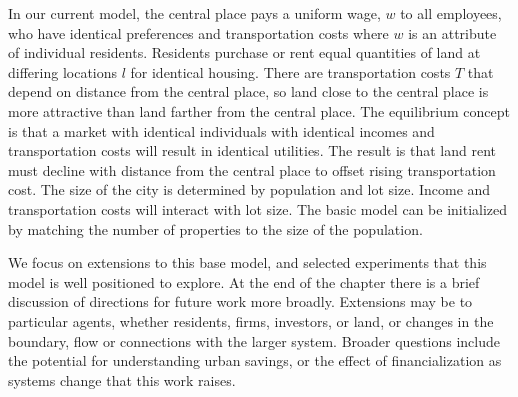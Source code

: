 

In our current model, the central place pays a uniform wage, $w$ to all employees, who have identical preferences and transportation costs where $w$ is an attribute of individual residents. Residents purchase or rent equal quantities of land at differing locations $l$ for identical housing.  There are transportation costs $T$ that depend on distance from the central place, so land close to the central place is more attractive than land farther from the central place.  The equilibrium concept is that a market with identical individuals with identical incomes and transportation costs will result in identical utilities. The result is that land rent must decline with distance from the central place to offset rising transportation cost. The size of the city is determined by population and lot size. Income and transportation costs will interact with lot size. The basic model can be initialized by matching the number of properties to the size of the population. %

We focus on extensions to this base model, and selected experiments that this model is well positioned to explore.  At the end of the chapter there is a brief discussion of directions for future work more broadly. Extensions may be to particular agents, whether residents, firms, investors, or land, or changes in the boundary, flow or connections with the larger system. Broader questions include the potential for understanding urban savings, or the effect of financialization as systems change that this work raises. %

